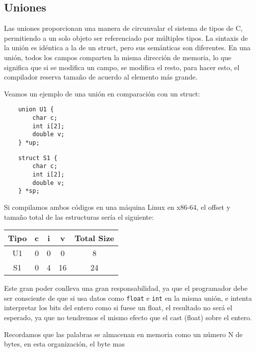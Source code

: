 \subsection{Uniones}
Las uniones proporcionan una manera de circunvalar el sistema de tipos de C, permitiendo a un solo objeto ser referenciado por múltiples tipos. La sintaxis de la unión es idéntica a la de un struct, pero 
sus semánticas son diferentes. En una unión, todos los campos comparten la misma dirección de memoria, lo que significa que si se modifica un campo, se modifica el resto, para hacer esto, el compilador reserva
tamaño de acuerdo al elemento más grande.
\begin{ejemplo}
    Veamos un ejemplo de una unión en comparación con un struct:
    \begin{center}
        \begin{minipage}{0.45\textwidth}
            \begin{verbatim}
    union U1 {
        char c;
        int i[2];
        double v;
    } *up;
    \end{verbatim}
    \end{minipage}
    \begin{minipage}{0.45\textwidth}
        \begin{verbatim}
    struct S1 {
        char c;
        int i[2];
        double v;
    } *sp;
        \end{verbatim}
    \end{minipage}
\end{center} 
Si compilamos ambos códigos en una máquina Linux en x86-64, el offset y tamaño total de las estructuras sería el siguiente:
\begin{center}
    \begin{tabular}{ccccc}
        Tipo & c & i & v & Total Size \\ 
        \hline 
        U1 & 0 & 0 & 0 & 8 \\ 
        S1 & 0 & 4 & 16 & 24 \\ 
    \end{tabular}
\end{center}
Este gran poder conlleva una gran responsabilidad, ya que el programador debe ser consciente de que 
si usa datos como \texttt{float} e \texttt{int} en la misma unión, 
e intenta interpretar los bits del entero como si fuese un float,
el resultado no será el esperado, ya que no tendremos el mismo efecto que el cast (float) sobre el entero.
\end{ejemplo}
Recordamos que las palabras se almacenan en memoria como un número N de bytes, en esta organización, el byte mas 
